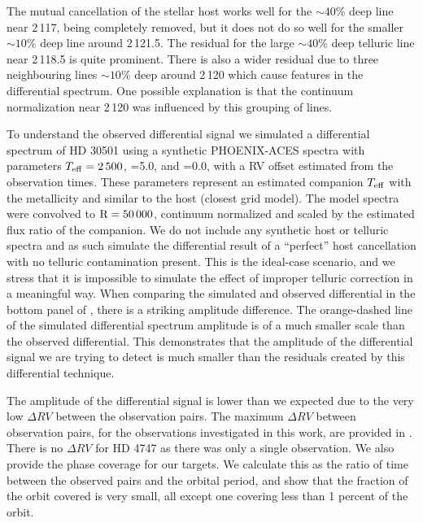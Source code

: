 The mutual cancellation of the stellar host works well for the \(\sim40\%\) deep line near 2\,117\nm{}, being completely removed, but it does not do so well for the smaller \(\sim10\%\) deep line around 2\,121.5\nm{}. The residual for the large \(\sim40\%\) deep telluric line near 2\,118.5\nm{} is quite prominent. There is also a wider residual due to three neighbouring lines \(\sim10\%\) deep around 2\,120\nm{} which cause features in the differential spectrum. One possible explanation is that the continuum normalization near 2\,120\nm{} was influenced by this grouping of lines.

To understand the observed differential signal we simulated a differential spectrum of {HD 30501} using a synthetic {PHOENIX-ACES} spectra with parameters \(T_{\mathrm{eff}}{}=2\,500\)\K{}, \logg{}=5.0, and \feh{}=0.0, with a {RV} offset estimated from the observation times. These parameters represent an estimated companion \(T_{\mathrm{eff}}{}\) with the metallicity and \logg{} similar to the host (closest grid model). The model spectra were convolved to \(\rm R=50\,000\), continuum normalized and scaled by the estimated flux ratio of the companion. We do not include any synthetic host or telluric spectra and as such simulate the differential result of a ``perfect'' host cancellation with no telluric contamination present. This is the ideal-case scenario, and we stress that it is impossible to simulate the effect of improper telluric correction in a meaningful way. When comparing the simulated and observed differential in the bottom panel of , there is a striking amplitude difference. The orange-dashed line of the simulated differential spectrum amplitude is of a much smaller scale than the observed differential. This demonstrates that the amplitude of the differential signal we are trying to detect is much smaller than the residuals created by this differential technique.

The amplitude of the differential signal is lower than we expected due to the very low \(\Delta {RV}\) between the observation pairs. The maximum \(\Delta {RV}\) between observation pairs, for the observations investigated in this work, are provided in . {\red{} There is no \(\Delta {RV}\) for {HD 4747} as there was only a single observation. We also provide the phase coverage for our targets. We calculate this as the ratio of time between the observed pairs and the orbital period, and show that the fraction of the orbit covered is very small, all except one covering less than 1 percent of the orbit.}

